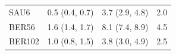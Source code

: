 \documentclass[draft]{aa}
\begin{document}
\begin{table}
\begin{tabular}{llll}
   SAU6          & 0.5 (0.4, 0.7) &  3.7 (2.9, 4.8) &  2.0\\
   BER56         & 1.6 (1.4, 1.7) &  8.1 (7.4, 8.9) &  4.5\\
   BER102        & 1.0 (0.8, 1.5) &  3.8 (3.0, 4.9) &  2.5\\
  \hline
  \end{tabular}
  \end{table}
\end{document}
